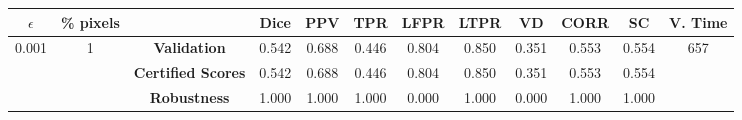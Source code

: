 \begin{longtable}{ c  c | c | c  c  c  c  c  c  c c c}
\toprule \textbf{$\epsilon$} & \textbf{\% pixels} & & \textbf{Dice} & \textbf{PPV} & \textbf{TPR} & \textbf{LFPR} & \textbf{LTPR} & \textbf{VD} & \textbf{CORR} & \textbf{SC} & \textbf{V. Time} \\
\midrule 
\multirow{3}{*}{0.001}  & \multirow{3}{*}{1} &\textbf{Validation} & 0.542 & 0.688 & 0.446 & 0.804 & 0.850 & 0.351 & 0.553 & 0.554 & \multirow{3}{*}{657} \\
 & & \textbf{Certified Scores} & 0.542 & 0.688 & 0.446 & 0.804 & 0.850 & 0.351 & 0.553 & 0.554 & \\
& & \textbf{Robustness} & 1.000 & 1.000 & 1.000 & 0.000 & 1.000 & 0.000 & 1.000 & 1.000 & \\
\end{longtable}